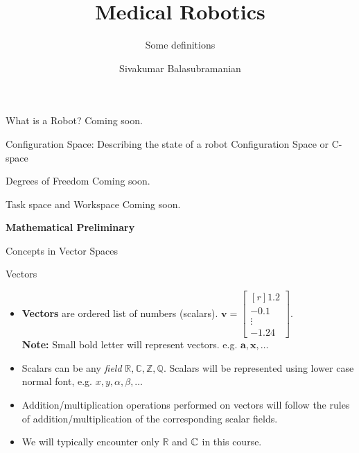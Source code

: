 \documentclass[aspectratio=169]{beamer}
\title{Medical Robotics}
\subtitle{Some definitions}
\author{Sivakumar Balasubramanian}
\institute[Christian Medical College] %
{
\inst{}%
Department of Bioengineering\\
Christian Medical College Vellore
}
\date{}
\begin{document}
\begin{frame}
  \titlepage
\end{frame}


\begin{frame}{What is a Robot?}
Coming soon.
\end{frame}


\begin{frame}{Configuration Space: Describing the state of a robot}
  Configuration Space or C-space
  
\end{frame}


\begin{frame}{Degrees of Freedom}
  Coming soon.
\end{frame}


\begin{frame}{Task space and Workspace}
  Coming soon.
\end{frame}


\begin{frame}
  \begin{center}
    \textcolor{myred}{\textbf{\huge{Mathematical Preliminary}}}\\
    \vspace{0.25cm}
    
    \textcolor{mygray}{\huge{Concepts in Vector Spaces}}
  \end{center}
\end{frame}


\begin{frame}{Vectors}
  \begin{itemize}
    \item \textbf{Vectors} are ordered list of numbers (scalars). $\mathbf{v} = \begin{bmatrix*}[r] 1.2 \\ -0.1 \\ \vdots \\-1.24 \end{bmatrix*}$.\\
    \textbf{Note:} Small bold letter will represent vectors. e.g. $\mathbf{a}, \mathbf{x}, \ldots $
    
    \item Scalars can be any \textit{field} $\mathbb{R}, \mathbb{C}, \mathbb{Z}, \mathbb{Q}$. Scalars will be represented using lower case normal font, e.g. $x, y, \alpha, \beta, \ldots$
    
    \item Addition/multiplication operations performed on vectors will follow the rules of addition/multiplication of the corresponding scalar fields.
    
    \item We will typically encounter only $\mathbb{R}$ and $\mathbb{C}$ in this course.
  \end{itemize}  
\end{frame}
\end{document}
